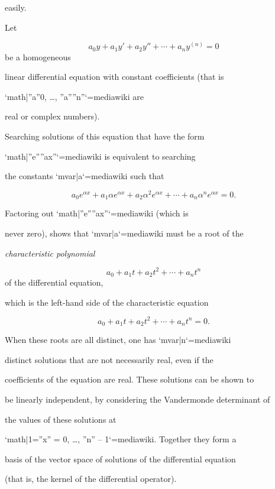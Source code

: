 easily.



Let



$$a_0y + a_1y' + a_2y'' + \cdots + a_ny^{(n)} = 0$$ be a homogeneous

linear differential equation with constant coefficients (that is

`{{math|''a''0, …, ''a''''n''}}`{=mediawiki} are

real or complex numbers).



Searching solutions of this equation that have the form

`{{math|''e''''ax''}}`{=mediawiki} is equivalent to searching

the constants `{{mvar|a}}`{=mediawiki} such that



$$a_0e^{\alpha x} + a_1\alpha e^{\alpha x} + a_2\alpha^2 e^{\alpha x}+\cdots + a_n\alpha^n e^{\alpha x} = 0.$$

Factoring out `{{math|''e''''ax''}}`{=mediawiki} (which is

never zero), shows that `{{mvar|a}}`{=mediawiki} must be a root of the

\textit{characteristic polynomial}



$$a_0 + a_1t + a_2t^2 + \cdots + a_nt^n$$ of the differential equation,

which is the left-hand side of the characteristic equation



$$a_0 + a_1t + a_2t^2 + \cdots + a_nt^n = 0.$$



When these roots are all distinct, one has `{{mvar|n}}`{=mediawiki}

distinct solutions that are not necessarily real, even if the

coefficients of the equation are real. These solutions can be shown to

be linearly independent, by considering the Vandermonde determinant of

the values of these solutions at

`{{math|1=''x'' = 0, …, ''n'' – 1}}`{=mediawiki}. Together they form a

basis of the vector space of solutions of the differential equation

(that is, the kernel of the differential operator).




